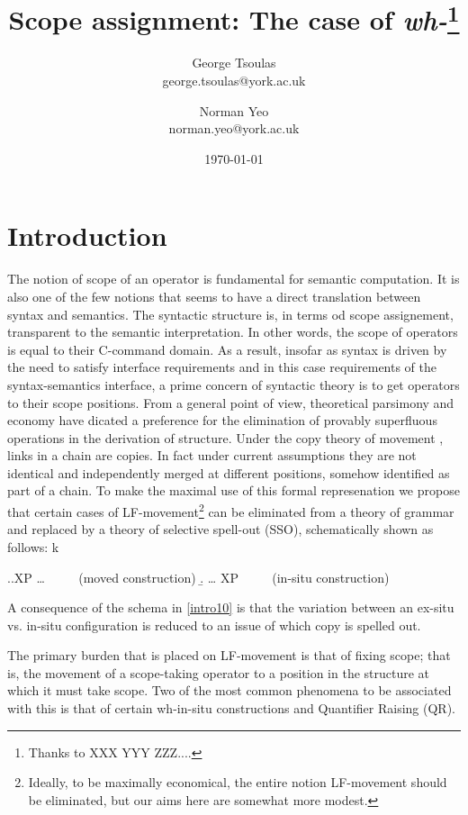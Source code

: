 \documentclass[11pt]{article}
\begin{document}
\title{Scope assignment: The case of \textit{wh-}\thanks{Thanks to XXX YYY ZZZ....}}
\author{George Tsoulas\\
george.tsoulas@york.ac.uk\\ \and
Norman Yeo\\
norman.yeo@york.ac.uk}
\date{\today}

\maketitle

\section{Introduction}
The notion of scope of an operator is fundamental for semantic computation.  It is also one of the few notions that seems to have a direct translation between syntax and semantics.  The syntactic structure is, in terms od scope assignement, transparent to the semantic interpretation.  In other words, the scope of operators is equal to their C-command domain.  As a result, insofar as syntax is driven by the need to satisfy interface requirements and in this case requirements of the syntax-semantics interface, a prime concern of syntactic theory is to get operators to their scope positions.  From a general point of view, theoretical parsimony and economy have dicated a preference for the elimination of provably superfluous operations in the derivation of structure. Under the copy theory of movement \citep{chomsky:1993}, links in a chain are copies.  In fact under current assumptions they are not identical and independently merged at different positions, somehow identified as part of a chain.  To make the maximal use of this formal represenation we propose that certain cases of LF-movement\footnote{Ideally, to be maximally economical, the entire notion LF-movement should be eliminated, but our aims here are somewhat more modest.} can be eliminated from a theory of grammar and replaced by a theory of selective spell-out (SSO), schematically shown as follows:
k

\ex.\label{intro10}\a.XP {\dots}  $\qquad$ (moved construction)
    \b. {\dots} XP $\qquad$ (in-situ construction)

A consequence of the schema in \ref{intro10} is that the variation between an ex-situ vs. in-situ configuration is reduced to an issue of which copy is spelled out.

The primary burden that is placed on LF-movement is that of fixing scope; that is, the movement of a scope-taking operator to a position in the structure at which it must take scope. Two of the most common phenomena to be associated with this is that of certain wh-in-situ constructions and Quantifier Raising (QR).
\end{document}
